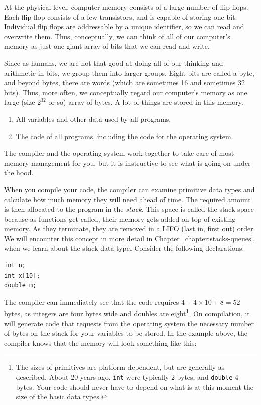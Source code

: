 At the physical level, computer memory consists of a large number of flip flops.
Each flip flop consists of a few transistors, and is capable of storing one bit.
Individual flip flops are addressable by a unique identifier, so we can read and overwrite them. 
Thus, conceptually, we can think of all of our computer's memory as just one giant array of bits that we can read and write.

Since as humans, we are not that good at doing all of our thinking and arithmetic in bits, we group them into larger groups.
Eight bits are called a byte, and beyond bytes, there are words (which are sometimes 16 and sometimes 32 bits).
Thus, more often, we conceptually regard our computer's memory as one large (size $2^{32}$ or so) array of bytes.
A lot of things are stored in this memory.

\begin{enumerate}
\item All variables and other data used by all programs.
\item The code of all programs, including the code for the operating system.
\end{enumerate}

The compiler and the operating system work together to take care of most memory management for you, but it is instructive to see what is going on under the hood.

When you compile your code, the compiler can examine primitive data types and calculate how much memory they will need ahead of time.
The required amount is then allocated to the program in the \emph{stack}.
This space is called the stack space because as functions get called, their memory gets added on top of existing memory.
As they terminate, they are removed in a LIFO (last in, first out) order.
We will encounter this concept in more detail in Chapter~\ref{chapter:stacks-queues}, when we learn about the stack data type.
Consider the following declarations: 

\begin{verbatim}
int n;
int x[10];
double m;
\end{verbatim}

The compiler can immediately see that the code requires $4+4\times10+8=52$ bytes, as integers are four bytes wide and doubles are eight\footnote{
The sizes of primitives are platform dependent, but are generally as described.
About 20 years ago, \texttt{int} were typically 2 bytes, and \texttt{double} 4 bytes.
Your code should never have to depend on what is at this moment the size of the basic data types.}.
On compilation, it will generate code that requests from the operating system the necessary number of bytes on the stack for your variables to be stored.
In the example above, the compiler knows that the memory will look something like this:

